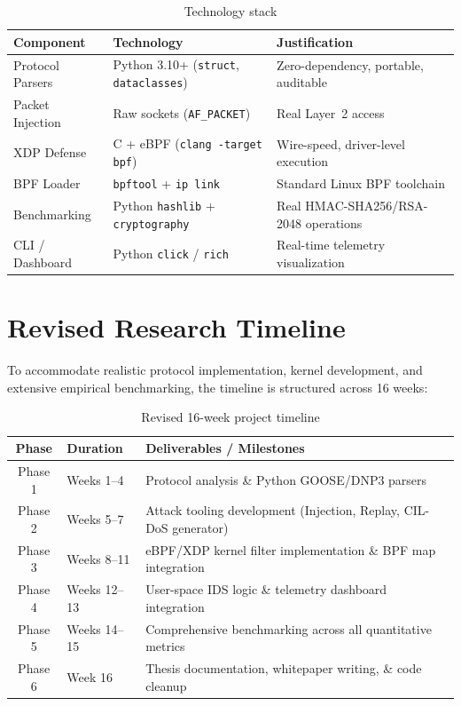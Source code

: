 \documentclass[12pt,a4paper]{article}
\begin{document}
\begin{table}[H]
\centering
\caption{Technology stack}
\label{tab:tech}
\begin{tabularx}{\textwidth}{llX}
\toprule
\textbf{Component} & \textbf{Technology} & \textbf{Justification} \\
\midrule
Protocol Parsers & Python 3.10+ (\texttt{struct}, \texttt{dataclasses}) & Zero-dependency, portable, auditable \\
Packet Injection & Raw sockets (\texttt{AF\_PACKET}) & Real Layer~2 access \\
XDP Defense & C + eBPF (\texttt{clang -target bpf}) & Wire-speed, driver-level execution \\
BPF Loader & \texttt{bpftool} + \texttt{ip link} & Standard Linux BPF toolchain \\
Benchmarking & Python \texttt{hashlib} + \texttt{cryptography} & Real HMAC-SHA256/RSA-2048 operations \\
CLI / Dashboard & Python \texttt{click} / \texttt{rich} & Real-time telemetry visualization \\
\bottomrule
\end{tabularx}
\end{table}

\section{Revised Research Timeline}

To accommodate realistic protocol implementation, kernel development, and extensive empirical benchmarking, the timeline is structured across 16 weeks:

\begin{table}[H]
\centering
\caption{Revised 16-week project timeline}
\label{tab:timeline}
\begin{tabularx}{\textwidth}{clX}
\toprule
\textbf{Phase} & \textbf{Duration} & \textbf{Deliverables / Milestones} \\
\midrule
Phase 1 & Weeks 1--4 & Protocol analysis \& Python GOOSE/DNP3 parsers \\
Phase 2 & Weeks 5--7 & Attack tooling development (Injection, Replay, CIL-DoS generator) \\
Phase 3 & Weeks 8--11 & eBPF/XDP kernel filter implementation \& BPF map integration \\
Phase 4 & Weeks 12--13 & User-space IDS logic \& telemetry dashboard integration \\
Phase 5 & Weeks 14--15 & Comprehensive benchmarking across all quantitative metrics \\
Phase 6 & Week 16 & Thesis documentation, whitepaper writing, \& code cleanup \\
\bottomrule
\end{tabularx}
\end{table}
\end{document}
